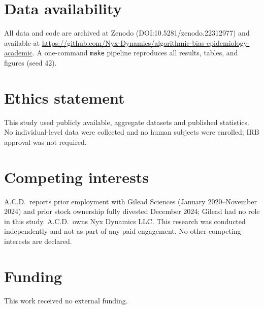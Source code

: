 \documentclass[10pt,letterpaper]{article}
\begin{document}
\section*{Data availability}
All data and code are archived at Zenodo (DOI:10.5281/zenodo.22312977) and available at \url{https://github.com/Nyx-Dynamics/algorithmic-bias-epidemiology-academic}. A one-command \texttt{make} pipeline reproduces all results, tables, and figures (seed 42).

\section*{Ethics statement}
This study used publicly available, aggregate datasets and published statistics. No individual-level data were collected and no human subjects were enrolled; IRB approval was not required.

\section*{Competing interests}
A.C.D.\ reports prior employment with Gilead Sciences (January 2020--November 2024) and prior stock ownership fully divested December 2024; Gilead had no role in this study. A.C.D.\ owns Nyx Dynamics LLC. This research was conducted independently and not as part of any paid engagement. No other competing interests are declared.

\section*{Funding}
This work received no external funding.

\nolinenumbers
\FloatBarrier
\clearpage

\end{document}
